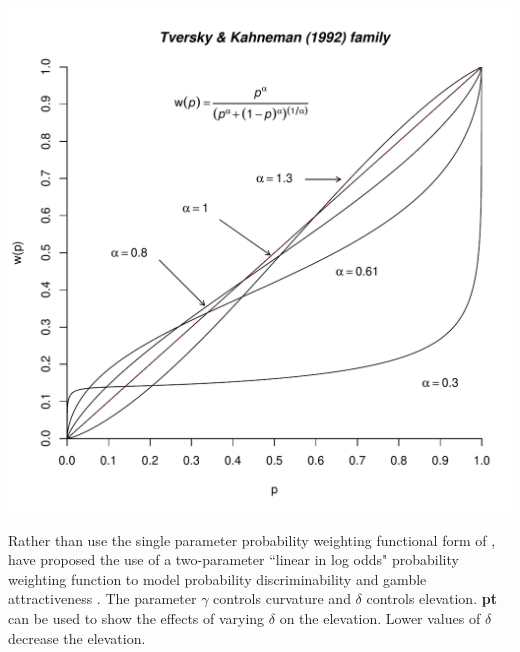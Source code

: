 \documentclass{article}\usepackage[]{graphicx}\usepackage[]{color}
\makeatletter
\def\maxwidth{ %
  \ifdim\Gin@nat@width>\linewidth
    \linewidth
  \else
    \Gin@nat@width
  \fi
}
\newenvironment{knitrout}{}{} %
\makeatother
\begin{document}
\begin{knitrout}
{\centering \includegraphics[width=\maxwidth]{figure/unnamed-chunk-21} 

}



\end{knitrout}


Rather than use the single parameter probability weighting functional form of \cite{Tversky_Kahneman_1992}, \cite{Gonzalez_Wu_1999} have proposed the use of
a two-parameter ``linear in log odds" probability weighting function to model probability discriminability and gamble attractiveness \cite[Figure 4 p. 140]{Gonzalez_Wu_1999}. The parameter $\gamma$ controls curvature and $\delta$ controls elevation. {\bf pt} can be used to show the effects of varying $\delta$ on the elevation. Lower values of $\delta$ decrease the elevation.
\end{document}
